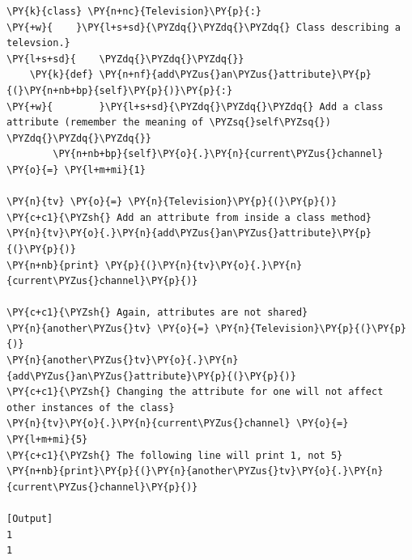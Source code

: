 \begin{Verbatim}[label=\makebox{\url{https://github.com/lucabaldini/cmepda/tree/master/slides/latex/snippets/class\_attributes\_2.py}},commandchars=\\\{\}]
\PY{k}{class} \PY{n+nc}{Television}\PY{p}{:}
\PY{+w}{    }\PY{l+s+sd}{\PYZdq{}\PYZdq{}\PYZdq{} Class describing a televsion.}
\PY{l+s+sd}{    \PYZdq{}\PYZdq{}\PYZdq{}}
    \PY{k}{def} \PY{n+nf}{add\PYZus{}an\PYZus{}attribute}\PY{p}{(}\PY{n+nb+bp}{self}\PY{p}{)}\PY{p}{:}
\PY{+w}{        }\PY{l+s+sd}{\PYZdq{}\PYZdq{}\PYZdq{} Add a class attribute (remember the meaning of \PYZsq{}self\PYZsq{}) \PYZdq{}\PYZdq{}\PYZdq{}}
        \PY{n+nb+bp}{self}\PY{o}{.}\PY{n}{current\PYZus{}channel} \PY{o}{=} \PY{l+m+mi}{1}

\PY{n}{tv} \PY{o}{=} \PY{n}{Television}\PY{p}{(}\PY{p}{)}
\PY{c+c1}{\PYZsh{} Add an attribute from inside a class method}
\PY{n}{tv}\PY{o}{.}\PY{n}{add\PYZus{}an\PYZus{}attribute}\PY{p}{(}\PY{p}{)}
\PY{n+nb}{print} \PY{p}{(}\PY{n}{tv}\PY{o}{.}\PY{n}{current\PYZus{}channel}\PY{p}{)}

\PY{c+c1}{\PYZsh{} Again, attributes are not shared}
\PY{n}{another\PYZus{}tv} \PY{o}{=} \PY{n}{Television}\PY{p}{(}\PY{p}{)}
\PY{n}{another\PYZus{}tv}\PY{o}{.}\PY{n}{add\PYZus{}an\PYZus{}attribute}\PY{p}{(}\PY{p}{)}
\PY{c+c1}{\PYZsh{} Changing the attribute for one will not affect other instances of the class}
\PY{n}{tv}\PY{o}{.}\PY{n}{current\PYZus{}channel} \PY{o}{=} \PY{l+m+mi}{5}
\PY{c+c1}{\PYZsh{} The following line will print 1, not 5}
\PY{n+nb}{print}\PY{p}{(}\PY{n}{another\PYZus{}tv}\PY{o}{.}\PY{n}{current\PYZus{}channel}\PY{p}{)}

[Output]
1
1
\end{Verbatim}